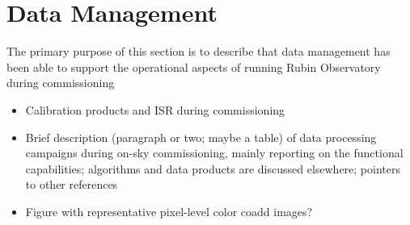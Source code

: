\section{Data Management}
\label{sec:data_management}

The primary purpose of this section is to describe that data management has been able to support the operational aspects of running Rubin Observatory during commissioning

\begin{itemize}
    \item Calibration products and ISR during commissioning
    \item Brief description (paragraph or two; maybe a table) of data processing campaigns during on-sky commissioning, mainly reporting on the functional capabilities; algorithms and data products are discussed elsewhere; pointers to other references
    \item Figure with representative pixel-level color coadd images?
\end{itemize}

